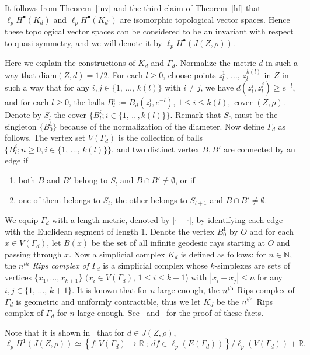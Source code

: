 \documentclass[10pt]{amsart}
\theoremstyle{definition}\newtheorem{defi}[theo]{Definition}\newtheorem{rema}[theo]{Remark}\newtheorem{exam}[theo]{Example}\newtheorem{exem}[theo]{Example}\newtheorem{nota}[theo]{Notation}
\newcommand{\br}{\mathbb{R}}
\newcommand{\bn}{\mathbb{N}}
\begin{document}
It follows from Theorem~\ref{inv} and the third claim of Theorem~\ref{hf} that $\ell_pH^{\bullet}(K_d)$ and
$\ell_pH^{\bullet}(K_{d'})$ are isomorphic topological vector spaces. Hence these topological vector spaces can be considered to be an invariant with respect to quasi-symmetry, and we will denote it by $\ell_pH^{\bullet}(J(Z,\rho))$.


Here we explain the constructions of $K_{d}$ and $\Gamma_{d}$. Normalize the metric $d$ in such a way that diam$(Z,d)=1/2$. For each $l\geq0$, choose points $z^1_l,\,\dots,\,z^{k(l)}_l$ in $Z$ in such a way that for any $i,j\in\{1,\,\dots,\,k(l)\}$ with $i\neq j$, we have $d(z_l^i,z_l^j)\geq e^{-l}$, and for each $l\geq0$, the balls $B_l^i:=B_{d}(z_l^i,e^{-l})$, $1\leq i\leq k(l),$ cover $(Z,\rho)$. Denote by $S_l$ the cover $\{B_l^i;i\in\{1,\,..\,,k(l)\}\}$. Remark that $S_0$ must be the singleton $\{B_0^1\}$ because of the normalization of the diameter. Now define $\Gamma_{d}$ as follows. The vertex set $V(\Gamma_{d})$ is the collection of balls $
\{B_l^i;n\geq0,i\in\{1,\,\dots,\,k(l)\}\}$, and two distinct vertex $B,B'$ are connected by an edge if
\begin{enumerate}
\item both $B$ and $B'$ belong to $S_l$ and $B\cap B'\neq\emptyset$, or if
\item one of them belongs to $S_l$, the other belongs to $S_{l+1}$ and $B\cap B'\neq\emptyset$.
\end{enumerate}
We equip $\Gamma_{d}$ with a length metric, denoted by $|\cdot-\cdot|$, by identifying each edge with the Euclidean segment of length 1. Denote the vertex $B_0^1$ by $O$ and for each $x\in V(\Gamma_{d})$, let $B(x)$ be the set of all infinite geodesic rays starting at $O$ and passing through $x$. Now a simplicial complex $K_{d}$ is defined as follows: for $n\in\bn$, the \emph{$n^{th}$ Rips complex of $\Gamma_{d}$} is a simplicial complex whose $k$-simplexes are sets of vertices $\{x_1,\dots,x_{k+1}\}$ $(x_i\in V(\Gamma_{d})$, $1\leq i\leq k+1$) with $|x_i-x_j|\leq n$ for any $i,j\in\{1,\,\dots,\,k+1\}$. It is known that for $n$ large enough, the $n^{\rm th}$ Rips complex of $\Gamma_{d}$ is geometric and uniformly contractible, thus we let $K_{d}$ be the $n^{\rm th}$ Rips complex of $\Gamma_{d}$ for $n$ large enough. See~\cite[Section~3]{BH} and~\cite{BP} for the proof of these facts.

Note that it is shown in~\cite{BP} that for $d\in J(Z,\rho)$,
\begin{equation}\label{coho}
\ell_pH^{1}(J(Z,\rho))\simeq
\left\{f:V(\Gamma_{d})\rightarrow\br\ ;\ df\in\ell_p(E(\Gamma_{d}))\right\}/\ell_p(V(\Gamma_{d}))+\br.
\end{equation}
\end{document}
